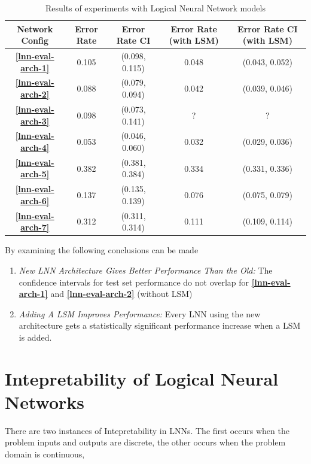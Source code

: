 \begin{table}[H]
	\begin{center}
		\begin{tabular}{| c | c | c | c | c |}
			\hline
			\textbf{Network Config} & \textbf{Error Rate} & \textbf{Error Rate CI} & \textbf{Error Rate (with LSM)} & \textbf{Error Rate CI (with LSM)}\\
			\hline
			\hline
			\textbf{\ref{lnn-eval-arch-1}} & 0.105 & (0.098, 0.115) & 0.048 & (0.043, 0.052)\\
			\textbf{\ref{lnn-eval-arch-2}} & 0.088 & (0.079, 0.094) & 0.042 & (0.039, 0.046)\\
			\textbf{\ref{lnn-eval-arch-3}} & 0.098 & (0.073, 0.141) & ? & ?\\
			\textbf{\ref{lnn-eval-arch-4}} & 0.053 & (0.046, 0.060) & 0.032 & (0.029, 0.036)\\
			\textbf{\ref{lnn-eval-arch-5}} & 0.382 & (0.381, 0.384) & 0.334 & (0.331, 0.336)\\
			\textbf{\ref{lnn-eval-arch-6}} & 0.137 & (0.135, 0.139) & 0.076 & (0.075, 0.079)\\
			\textbf{\ref{lnn-eval-arch-7}} & 0.312 & (0.311, 0.314) & 0.111 & (0.109, 0.114)\\
			\hline
		\end{tabular}
	\end{center}
	\caption{Results of experiments with Logical Neural Network models}
	\label{tab:mnist-lnn-peformance-results}
\end{table}

By examining the following conclusions can be made
\begin{enumerate}
	\item \textit{New LNN Architecture Gives Better Performance Than the Old:} The confidence intervals for test set performance do not overlap for \textbf{\ref{lnn-eval-arch-1}} and \textbf{\ref{lnn-eval-arch-2}} (without LSM)
	
	\item \textit{Adding A LSM Improves Performance:} Every LNN using the new architecture gets a statistically significant performance increase when a LSM is added.
\end{enumerate}


\section{Intepretability of Logical Neural Networks}
There are two instances of Intepretability in LNNs. The first occurs when the problem inputs and outputs are discrete, the other occurs when the problem domain is continuous, 

